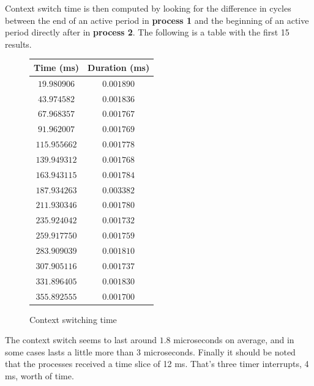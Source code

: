 \documentclass[oneside]{amsart}
\theoremstyle{definition}
\theoremstyle{remark}
\numberwithin{equation}{section}
\begin{document}
Context switch time is then computed by looking for the difference in cycles between the end of an
active period in \textbf{process 1} and the beginning of an active period directly after in
\textbf{process 2}. The following is a table with the first 15 results.

\begin{figure}[h]
    \caption{Context switching time}
    \begin{tabular}{c|c}
        \rowcolor{gray!50}
        Time (ms) & Duration (ms) \\
        \hline
        $19.980906 $ & $0.001890$ \\
        $43.974582 $ & $0.001836$ \\
        $67.968357 $ & $0.001767$ \\
        $91.962007 $ & $0.001769$ \\
        $115.955662$ & $0.001778$ \\
        $139.949312$ & $0.001768$ \\
        $163.943115$ & $0.001784$ \\
        $187.934263$ & $0.003382$ \\
        $211.930346$ & $0.001780$ \\
        $235.924042$ & $0.001732$ \\
        $259.917750$ & $0.001759$ \\
        $283.909039$ & $0.001810$ \\
        $307.905116$ & $0.001737$ \\
        $331.896405$ & $0.001830$ \\
        $355.892555$ & $0.001700$
    \end{tabular}
\end{figure}

The context switch seems to last around $1.8$ microseconds on average, and in some cases lasts
a little more than $3$ microseconds. Finally it should be noted that the processes received a time
slice of 12 ms. That's three timer interrupts, 4 ms, worth of time.

\end{document}
